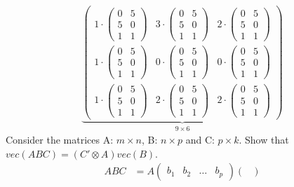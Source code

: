 \documentclass[a4paper]{scrartcl}
\begin{document}
\begin{enumerate}
\begin{solution}
\begin{align*}
                      \underbrace{\begin{pmatrix} 1\cdot\begin{pmatrix}0&5\\5&0\\1&1 \end{pmatrix}&3\cdot\begin{pmatrix}0&5\\5&0\\1&1 \end{pmatrix}&2\cdot\begin{pmatrix}0&5\\5&0\\1&1 \end{pmatrix}\\1\cdot\begin{pmatrix}0&5\\5&0\\1&1 \end{pmatrix}&0\cdot\begin{pmatrix}0&5\\5&0\\1&1 \end{pmatrix}&0\cdot\begin{pmatrix}0&5\\5&0\\1&1 \end{pmatrix}\\1\cdot\begin{pmatrix}0&5\\5&0\\1&1 \end{pmatrix}&2\cdot\begin{pmatrix}0&5\\5&0\\1&1 \end{pmatrix}&2\cdot\begin{pmatrix}0&5\\5&0\\1&1 \end{pmatrix}  \end{pmatrix}}_{9\times6}
                  \end{align*}
                  Consider the matrices A: $m\times n$, B: $n\times p$ and C: $p\times k$. Show that $vec(ABC)=\left(C'\otimes A\right) vec(B)$.
                  \begin{align*}
                      ABC & = A \begin{pmatrix} b_1 & b_2 & \dots & b_p \end{pmatrix}
                      \begin{pmatrix}

\end{pmatrix}
\end{align*}
\end{solution}
\end{enumerate}
\end{document}
